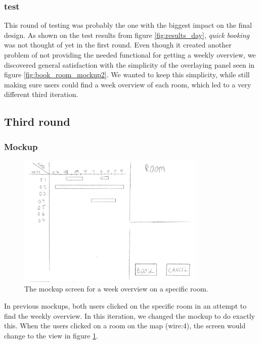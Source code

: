 \subsubsection{test}
This round of testing was probably the one with the biggest impact on the final design. As shown on the test results from figure \ref{fig:results_day}, \emph{quick booking} was not thought of yet in the first round. Even though it created another problem of not providing the needed functional for getting a weekly overview, we discovered general satisfaction with the simplicity of the overlaying panel seen in figure \ref{fig:book_room_mockup2}. We wanted to keep this simplicity, while still making sure users could find a week overview of each room, which led to a very different third iteration.
\pagebreak

\subsection{Third round}
\subsubsection{Mockup}
\begin{figure}[htb]
\begin{center}
\leavevmode
\includegraphics[width=0.8\textwidth]{images/weekMockup}
\end{center}
\caption{The mockup screen for a week overview on a specific room.}
\label{fig:week_mockup}
\end{figure}

In previous mockups, both users clicked on the specific room in an attempt to find the weekly overview.
In this iteration, we changed the mockup to do exactly this. When the users clicked on a room on the map (wire:4), the screen would change to the view in figure \ref{fig:week_mockup}.\\

